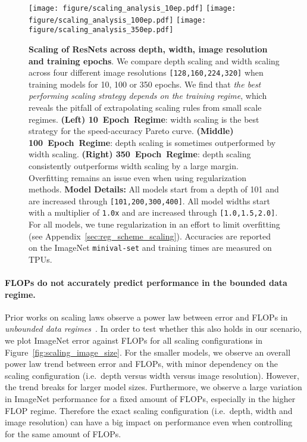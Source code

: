 \documentclass{article}
\begin{document}
\begin{figure*}[ht!]
    \begin{center}
    \texttt{[image: figure/scaling\_analysis\_10ep.pdf]}
    \texttt{[image: figure/scaling\_analysis\_100ep.pdf]}
    \texttt{[image: figure/scaling\_analysis\_350ep.pdf]}
    \end{center}
    \vspace{-0.3cm}
    \caption{\textbf{Scaling of ResNets across depth, width, image resolution and training epochs}. We compare depth scaling and width scaling across four different image resolutions \texttt{[128,160,224,320]} when training models for 10, 100 or 350 epochs.
    We find that \emph{the best performing scaling strategy depends on the training regime}, which reveals the pitfall of extrapolating scaling rules from small scale regimes.
    \textbf{(Left) 10~Epoch~Regime}: width scaling is the best strategy for the speed-accuracy Pareto curve.
    \textbf{(Middle) 100~Epoch~Regime}: depth scaling is sometimes outperformed by width scaling.
    \textbf{(Right) 350~Epoch~Regime}: depth scaling consistently outperforms width scaling by a large margin. Overfitting remains an issue even when using regularization methods.
    \textbf{Model Details:} All models start from a depth of 101 and are increased through \texttt{[101,200,300,400]}. All model widths start with a multiplier of \texttt{1.0x} and are increased through \texttt{[1.0,1.5,2.0]}.
    For all models, we tune regularization in an effort to limit overfitting (see Appendix~\ref{sec:reg_scheme_scaling}).
    Accuracies are reported on the ImageNet \texttt{minival-set} and training times are measured on TPUs.}
    \label{fig:scaling_analysis}
    \vspace{-0.1cm}
\end{figure*}

\paragraph{FLOPs do not accurately predict performance in the bounded data regime.}
Prior works on scaling laws observe a power law between error and FLOPs in \emph{unbounded data regimes}~\cite{kaplan2020scaling,henighan2020scaling}.
In order to test whether this also holds in our scenario, we plot ImageNet error against FLOPs for all scaling configurations in Figure~\ref{fig:scaling_image_size}.
For the smaller models, we observe an overall power law trend between error and FLOPs, with minor dependency on the scaling configuration (i.e.\ depth versus width versus image resolution).
However, the trend breaks for larger model sizes. 
Furthermore, we observe a large variation in ImageNet performance for a fixed amount of FLOPs, especially in the higher FLOP regime. 
Therefore the exact scaling configuration (i.e.\ depth, width and image resolution) can have a big impact on performance even when controlling for the same amount of FLOPs.
\end{document}
